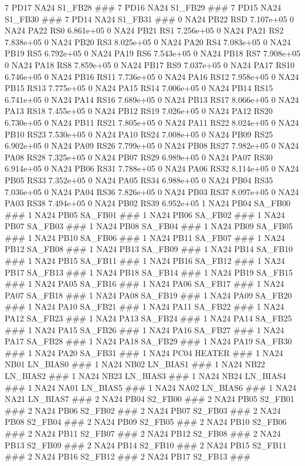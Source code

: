 7 PD17 NA24 S1_FB28 ### 
7 PD16 NA24 S1_FB29 ### 
7 PD15 NA24 S1_FB30 ### 
7 PD14 NA24 S1_FB31 ### 
0 NA24 PB22 RSD 7.107e+05 
0 NA24 PA22 RS0 6.861e+05 
0 NA24 PB21 RS1 7.256e+05 
0 NA24 PA21 RS2 7.838e+05 
0 NA24 PB20 RS3 8.025e+05 
0 NA24 PA20 RS4 7.083e+05 
0 NA24 PB19 RS5 6.792e+05 
0 NA24 PA19 RS6 7.543e+05 
0 NA24 PB18 RS7 7.908e+05 
0 NA24 PA18 RS8 7.859e+05 
0 NA24 PB17 RS9 7.037e+05 
0 NA24 PA17 RS10 6.746e+05 
0 NA24 PB16 RS11 7.736e+05 
0 NA24 PA16 RS12 7.958e+05 
0 NA24 PB15 RS13 7.775e+05 
0 NA24 PA15 RS14 7.006e+05 
0 NA24 PB14 RS15 6.741e+05 
0 NA24 PA14 RS16 7.689e+05 
0 NA24 PB13 RS17 8.066e+05 
0 NA24 PA13 RS18 7.455e+05 
0 NA24 PB12 RS19 7.026e+05 
0 NA24 PA12 RS20 6.730e+05 
0 NA24 PB11 RS21 7.805e+05 
0 NA24 PA11 RS22 8.024e+05 
0 NA24 PB10 RS23 7.530e+05 
0 NA24 PA10 RS24 7.008e+05 
0 NA24 PB09 RS25 6.902e+05 
0 NA24 PA09 RS26 7.799e+05 
0 NA24 PB08 RS27 7.982e+05 
0 NA24 PA08 RS28 7.325e+05 
0 NA24 PB07 RS29 6.989e+05 
0 NA24 PA07 RS30 6.914e+05 
0 NA24 PB06 RS31 7.788e+05 
0 NA24 PA06 RS32 8.114e+05 
0 NA24 PB05 RS33 7.352e+05 
0 NA24 PA05 RS34 6.988e+05 
0 NA24 PB04 RS35 7.036e+05 
0 NA24 PA04 RS36 7.826e+05 
0 NA24 PB03 RS37 8.097e+05 
0 NA24 PA03 RS38 7.494e+05 
0 NA24 PB02 RS39 6.952e+05 
1 NA24 PB04 SA_FB00 ### 
1 NA24 PB05 SA_FB01 ### 
1 NA24 PB06 SA_FB02 ### 
1 NA24 PB07 SA_FB03 ### 
1 NA24 PB08 SA_FB04 ### 
1 NA24 PB09 SA_FB05 ### 
1 NA24 PB10 SA_FB06 ### 
1 NA24 PB11 SA_FB07 ### 
1 NA24 PB12 SA_FB08 ### 
1 NA24 PB13 SA_FB09 ### 
1 NA24 PB14 SA_FB10 ### 
1 NA24 PB15 SA_FB11 ### 
1 NA24 PB16 SA_FB12 ### 
1 NA24 PB17 SA_FB13 ### 
1 NA24 PB18 SA_FB14 ### 
1 NA24 PB19 SA_FB15 ### 
1 NA24 PA05 SA_FB16 ### 
1 NA24 PA06 SA_FB17 ### 
1 NA24 PA07 SA_FB18 ### 
1 NA24 PA08 SA_FB19 ### 
1 NA24 PA09 SA_FB20 ### 
1 NA24 PA10 SA_FB21 ### 
1 NA24 PA11 SA_FB22 ### 
1 NA24 PA12 SA_FB23 ### 
1 NA24 PA13 SA_FB24 ### 
1 NA24 PA14 SA_FB25 ### 
1 NA24 PA15 SA_FB26 ### 
1 NA24 PA16 SA_FB27 ### 
1 NA24 PA17 SA_FB28 ### 
1 NA24 PA18 SA_FB29 ### 
1 NA24 PA19 SA_FB30 ### 
1 NA24 PA20 SA_FB31 ### 
1 NA24 PC04 HEATER ### 
1 NA24 NB01 LN_BIAS0 ### 
1 NA24 NB02 LN_BIAS1 ### 
1 NA24 NB22 LN_BIAS2 ### 
1 NA24 NB23 LN_BIAS3 ### 
1 NA24 NB24 LN_BIAS4 ### 
1 NA24 NA01 LN_BIAS5 ### 
1 NA24 NA02 LN_BIAS6 ### 
1 NA24 NA21 LN_BIAS7 ### 
2 NA24 PB04 S2_FB00 ### 
2 NA24 PB05 S2_FB01 ### 
2 NA24 PB06 S2_FB02 ### 
2 NA24 PB07 S2_FB03 ### 
2 NA24 PB08 S2_FB04 ### 
2 NA24 PB09 S2_FB05 ### 
2 NA24 PB10 S2_FB06 ### 
2 NA24 PB11 S2_FB07 ### 
2 NA24 PB12 S2_FB08 ### 
2 NA24 PB13 S2_FB09 ### 
2 NA24 PB14 S2_FB10 ### 
2 NA24 PB15 S2_FB11 ### 
2 NA24 PB16 S2_FB12 ### 
2 NA24 PB17 S2_FB13 ### 
